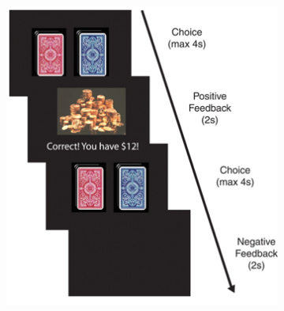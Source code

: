 \begin{description}
\begin{@empty}
\begin{example}
                \begin{figure}[H]
                    \centering
                    \begin{subfigure}{0.25\linewidth}
                        \centering
                        \includegraphics[width=\linewidth]{./img/instrumental_dopamine_sn1.png}
                    \end{subfigure}
                    \begin{subfigure}{0.55\linewidth}
                        \centering

\end{subfigure}
\end{figure}
\end{example}
\end{@empty}
\end{description}
